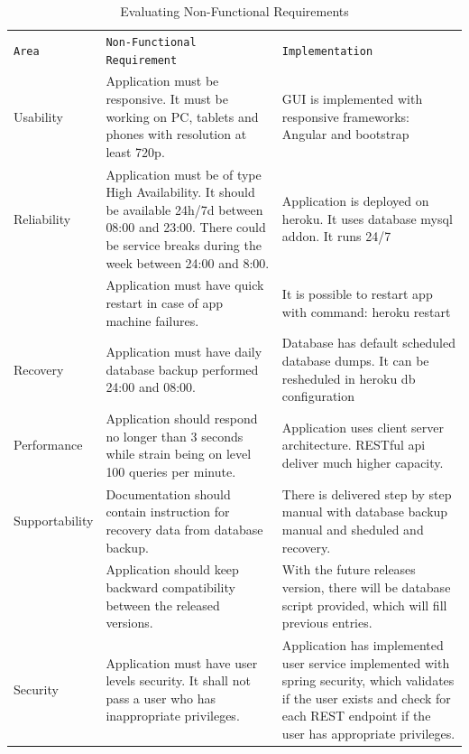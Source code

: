 \documentclass[a4paper,11pt,twoside]{report}
\theoremstyle{definition}
\begin{document}
\begin{longtable}{|p{3cm}|p{7cm}|p{6cm}|}
\caption[Evaluating Non-Functional Requirements]{Evaluating Non-Functional Requirements}
\label{Evaluating Non-Functional Requirements}
\centering
\tabularnewline

\hline
\texttt{Area} & \texttt{Non-Functional Requirement} & \texttt{Implementation} \\ \hline
Usability & Application must be responsive. It must be working on PC, tablets
and phones with resolution at least 720p. & GUI is implemented with responsive frameworks: Angular and bootstrap \\ \hline
Reliability & Application must be of type High Availability. It should be available
24h/7d between 08:00 and 23:00. There could be service
breaks during the week between 24:00 and 8:00. & Application is deployed on heroku. It uses database mysql addon. It runs 24/7 \\ \cline{2-3}
 & Application must have quick restart in case of app machine failures. & It is possible to restart app with command: heroku restart \\ \hline
Recovery & Application must have daily database backup performed  24:00 and 08:00. & 
Database has default scheduled database dumps. It can be resheduled in heroku db configuration \\ \hline
Performance & Application should respond no longer than 3 seconds while strain
being on level 100 queries per minute. & Application uses client server architecture. RESTful api deliver much higher capacity. \\ \hline
Supportability & Documentation should contain instruction for recovery data from
database backup. & There is delivered step by step manual with database backup manual and sheduled and recovery. \\ \cline{2-3}
 & Application should keep backward compatibility between the released
versions. & With the future releases version, there will be database script provided, which will fill previous entries. \\ \hline
Security & Application must have user levels security. It shall not pass a user who has inappropriate privileges. & Application has implemented user service implemented with spring security, which validates if the user exists and check for each REST endpoint if the user has appropriate privileges. \\ \hline

\end{longtable}
\end{document}
